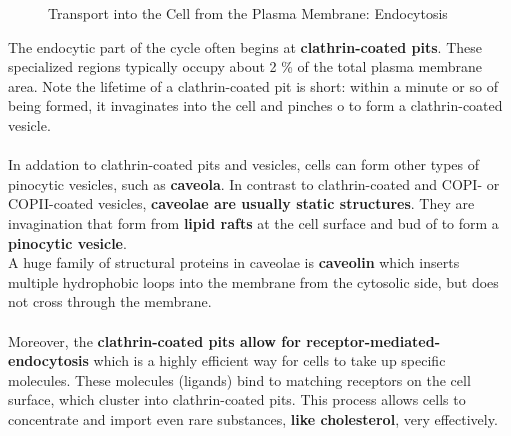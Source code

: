 \documentclass[../main.tex]{subfiles}
\begin{document}
\begin{figure}[H]
	\centering
	\caption{Transport into the Cell from the Plasma Membrane: Endocytosis}
\end{figure}

The endocytic part of the cycle often begins at \textbf{clathrin-coated pits}. These specialized regions typically occupy about 2 \% of the total plasma membrane area. Note the lifetime of a clathrin-coated pit is short: within a minute or so of being formed, it invaginates into the cell and pinches o to form a clathrin-coated vesicle. \\
\\
In addation to clathrin-coated pits and vesicles, cells can form other types of pinocytic vesicles, such as \textbf{\gls{caveola}}. In contrast to clathrin-coated and COPI- or COPII-coated vesicles, \textbf{caveolae are usually static structures}. They are invagination that form from \textbf{lipid rafts} at the cell surface and bud of to form a \textbf{pinocytic vesicle}. \\
\indent A huge family of structural proteins in caveolae is \textbf{\gls{caveolin}} which inserts multiple hydrophobic loops into the membrane from the cytosolic side, but does not cross through the membrane.\\
\\
Moreover, the \textbf{clathrin-coated pits allow for \gls{receptor-mediated-endocytosis}} which is a highly efficient way for cells to take up specific molecules. These molecules (ligands) bind to matching receptors on the cell surface, which cluster into clathrin-coated pits. This process allows cells to concentrate and import even rare substances, \textbf{like cholesterol}, very effectively.
\end{document}
